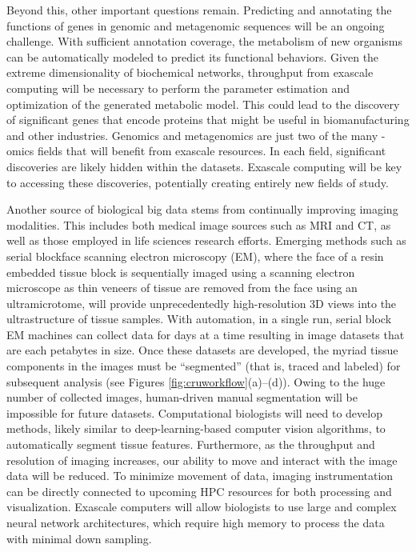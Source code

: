 \par Beyond this, other important questions remain. Predicting and annotating the functions of genes in genomic and metagenomic sequences will be an ongoing challenge. With sufficient annotation coverage, the metabolism of new organisms can be automatically modeled to predict its functional behaviors. Given the extreme dimensionality of biochemical networks, throughput from exascale computing will be necessary to perform the parameter estimation and optimization of the generated metabolic model. This could lead to the discovery of significant genes that encode proteins that might be useful in biomanufacturing and other industries. Genomics and metagenomics are just two of the many -omics fields that will benefit from exascale resources. In each field, significant discoveries are likely hidden within the datasets. Exascale computing will be key to accessing these discoveries, potentially creating entirely new fields of study.
\par Another source of biological big data stems from continually improving imaging modalities. This includes both medical image sources such as MRI and CT, as well as those employed in life sciences research efforts. Emerging methods such as serial blockface scanning electron microscopy (EM), where the face of a resin embedded tissue block is sequentially imaged using a scanning electron microscope as thin veneers of tissue are removed from the face using an ultramicrotome, will provide unprecedentedly high-resolution 3D views into the ultrastructure of tissue samples\cite{Denk2004}. With automation, in a single run, serial block EM machines can collect data for days at a time resulting in image datasets that are each petabytes in size. Once these datasets are developed, the myriad tissue components in the images must be ``segmented'' (that is, traced and labeled) for subsequent analysis (see Figures \ref{fig:cruworkflow}(a)–(d)). Owing to the huge number of collected images, human-driven manual segmentation will be impossible for future datasets. Computational biologists will need to develop methods, likely similar to deep-learning-based computer vision algorithms, to automatically segment tissue features. Furthermore, as the throughput and resolution of imaging increases, our ability to move and interact with the image data will be reduced. To minimize movement of data, imaging instrumentation can be directly connected to upcoming HPC resources for both processing and visualization. Exascale computers will allow biologists to use large and complex neural network architectures, which require high memory to process the data with minimal down sampling.
